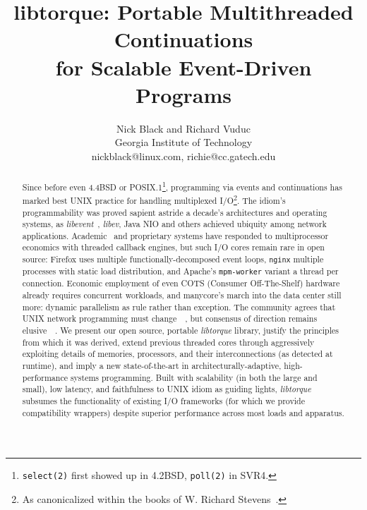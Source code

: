 \documentclass[letterpaper,10pt]{article}
\title{libtorque: Portable Multithreaded Continuations\\
for Scalable Event-Driven Programs}
\author{Nick Black and Richard Vuduc \\
Georgia Institute of Technology \\
nickblack@linux.com, richie@cc.gatech.edu
}
\date{}
\begin{document}
\maketitle
\begin{abstract}
Since before even 4.4BSD or POSIX.1\footnote{\texttt{select(2)} first showed up in 4.2BSD, \texttt{poll(2)} in
SVR4.}, programming via events and continuations has marked best UNIX practice
for handling multiplexed I/O\footnote{As canonicalized within the books of W. Richard Stevens~\cite{Stevens03}.}.
The idiom's programmability was proved sapient astride a decade's architectures
and operating systems, as \textit{libevent}~\cite{Mathewson09}, \textit{libev},
Java NIO and others achieved ubiquity among network applications. Academic~\cite{Welsh02} and proprietary systems
have responded to multiprocessor economics with threaded callback engines, but
such I/O cores remain rare in open source: Firefox uses
multiple functionally-decomposed event loops, \texttt{nginx} multiple processes
with static load distribution, and Apache's \texttt{mpm-worker} variant a thread
per connection. Economic employment of even COTS (Consumer Off-The-Shelf) hardware already
requires concurrent workloads, and manycore's march into the data
center still more: dynamic parallelism as rule rather than exception. The community agrees that UNIX network programming
must change~\cite{Drepper06}~\cite{Jacobson06}, but consensus of direction remains
elusive~\cite{Kegel2010}~\cite{Varghese05}. We present our open source,
portable \textit{libtorque} library, justify the principles from which it was derived, extend previous threaded cores through aggressively
exploiting details of memories, processors, and their interconnections (as detected at runtime), and imply a
new state-of-the-art in architecturally-adaptive, high-performance systems
programming. Built with scalability (in both the large and small), low latency,
and faithfulness to UNIX idiom as guiding lights, \textit{libtorque} subsumes the functionality of existing I/O frameworks (for which we provide compatibility
wrappers) despite superior performance across most loads and apparatus.
\end{abstract}
\end{document}
